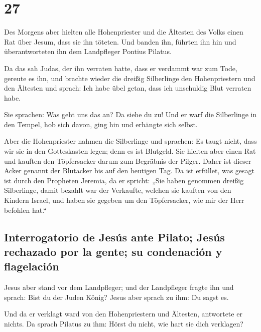 \hypertarget{section-26}{%
\section{27}\label{section-26}}

 Des Morgens aber hielten alle Hohenpriester und die
Ältesten des Volks einen Rat über Jesum, dass sie ihn töteten.
 Und banden ihn, führten ihn hin und überantworteten ihn
dem Landpfleger Pontius Pilatus.

 Da das sah Judas, der ihn verraten hatte, dass er
verdammt war zum Tode, gereute es ihn, und brachte wieder die dreißig
Silberlinge den Hohenpriestern und den Ältesten  und
sprach: Ich habe übel getan, dass ich unschuldig Blut verraten habe.

 Sie sprachen: Was geht uns das an? Da siehe du zu! Und er
warf die Silberlinge in den Tempel, hob sich davon, ging hin und
erhängte sich selbst.

 Aber die Hohenpriester nahmen die Silberlinge und
sprachen: Es taugt nicht, dass wir sie in den Gotteskasten legen; denn
es ist Blutgeld.  Sie hielten aber einen Rat und kauften
den Töpfersacker darum zum Begräbnis der Pilger.  Daher
ist dieser Acker genannt der Blutacker bis auf den heutigen Tag.
 Da ist erfüllet, was gesagt ist durch den Propheten
Jeremia, da er spricht: „Sie haben genommen dreißig Silberlinge, damit
bezahlt war der Verkaufte, welchen sie kauften von den Kindern Israel,
 und haben sie gegeben um den Töpfersacker, wie mir der
Herr befohlen hat.``

\hypertarget{interrogatorio-de-jesuxfas-ante-pilato-jesuxfas-rechazado-por-la-gente-su-condenaciuxf3n-y-flagelaciuxf3n}{%
\subsection{Interrogatorio de Jesús ante Pilato; Jesús rechazado por la
gente; su condenación y
flagelación}\label{interrogatorio-de-jesuxfas-ante-pilato-jesuxfas-rechazado-por-la-gente-su-condenaciuxf3n-y-flagelaciuxf3n}}

 Jesus aber stand vor dem Landpfleger; und der
Landpfleger fragte ihn und sprach: Bist du der Juden König? Jesus aber
sprach zu ihm: Du sagst es.

 Und da er verklagt ward von den Hohenpriestern und
Ältesten, antwortete er nichts.  Da sprach Pilatus zu
ihm: Hörst du nicht, wie hart sie dich verklagen?

